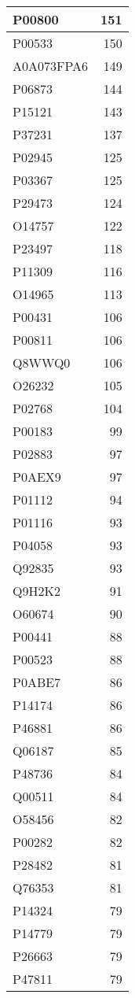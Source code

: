 \documentclass[
]{book}
\theoremstyle{definition}
\theoremstyle{definition}
\theoremstyle{definition}
\theoremstyle{definition}
\theoremstyle{remark}
\begin{document}
\begin{table}
\begin{tabular}{l|r}
\hline
P00800 & 151\\
\hline
P00533 & 150\\
\hline
A0A073FPA6 & 149\\
\hline
P06873 & 144\\
\hline
P15121 & 143\\
\hline
P37231 & 137\\
\hline
P02945 & 125\\
\hline
P03367 & 125\\
\hline
P29473 & 124\\
\hline
O14757 & 122\\
\hline
P23497 & 118\\
\hline
P11309 & 116\\
\hline
O14965 & 113\\
\hline
P00431 & 106\\
\hline
P00811 & 106\\
\hline
Q8WWQ0 & 106\\
\hline
O26232 & 105\\
\hline
P02768 & 104\\
\hline
P00183 & 99\\
\hline
P02883 & 97\\
\hline
P0AEX9 & 97\\
\hline
P01112 & 94\\
\hline
P01116 & 93\\
\hline
P04058 & 93\\
\hline
Q92835 & 93\\
\hline
Q9H2K2 & 91\\
\hline
O60674 & 90\\
\hline
P00441 & 88\\
\hline
P00523 & 88\\
\hline
P0ABE7 & 86\\
\hline
P14174 & 86\\
\hline
P46881 & 86\\
\hline
Q06187 & 85\\
\hline
P48736 & 84\\
\hline
Q00511 & 84\\
\hline
O58456 & 82\\
\hline
P00282 & 82\\
\hline
P28482 & 81\\
\hline
Q76353 & 81\\
\hline
P14324 & 79\\
\hline
P14779 & 79\\
\hline
P26663 & 79\\
\hline
P47811 & 79\\

\end{tabular}
\end{table}
\end{document}
